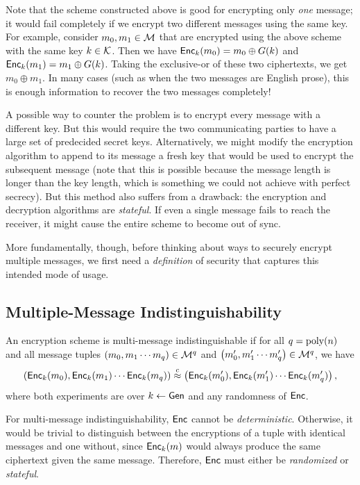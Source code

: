 \documentclass[11pt]{article}
\begin{document}
Note that the scheme constructed above is good for encrypting only
\emph{one} message; it would fail completely if we encrypt two
different messages using the same key.  For example, consider $m_0,
m_1 \in \mathcal{M}$ that are encrypted using the above scheme with the
same key $k \in \mathcal{K}$.  Then we have $\mathsf{Enc}_k(m_0) = m_0 \oplus
G(k)$ and $\mathsf{Enc}_k(m_1) = m_1 \oplus G(k)$.  Taking the exclusive-or
of these two ciphertexts, we get $m_0 \oplus m_1$.  In many cases
(such as when the two messages are English prose), this is enough
information to recover the two messages completely!

A possible way to counter the problem is to encrypt every message with
a different key.  But this would require the two communicating parties
to have a large set of predecided secret keys.  Alternatively, we
might modify the encryption algorithm to append to its message a fresh
key that would be used to encrypt the subsequent message (note that
this is possible because the message length is longer than the key
length, which is something we could not achieve with perfect secrecy).
But this method also suffers from a drawback: the encryption and
decryption algorithms are \emph{stateful}.  If even a single message
fails to reach the receiver, it might cause the entire scheme to
become out of sync.

More fundamentally, though, before thinking about ways to securely
encrypt multiple messages, we first need a \emph{definition} of
security that captures this intended mode of usage.

\subsection{Multiple-Message Indistinguishability}
\label{sec:mult-mess-indist}

\begin{definition}
  \label{def:multi-msg-indist}
  An encryption scheme is multi-message indistinguishable if for all
  $q=\operatorname{poly}(n)$ and all message tuples $\left( m_0, m_1 \cdots m_q
  \right) \in \mathcal{M}^q$ and $\left( m'_0, m'_1 \cdots m'_q \right)
  \in \mathcal{M}^q$, we have
  \[ \left( \mathsf{Enc}_k(m_0), \mathsf{Enc}_k(m_1) \cdots \mathsf{Enc}_k(m_q)
  \right) \stackrel{c}{\approx} \left( \mathsf{Enc}_k(m'_0), \mathsf{Enc}_k(m'_1) \cdots
    \mathsf{Enc}_k(m'_q) \right), \] where both experiments are over $k
  \gets \mathsf{Gen}$ and any randomness of $\mathsf{Enc}$.
\end{definition}

\begin{remark}
  For multi-message indistinguishability, $\mathsf{Enc}$ cannot be
  \emph{deterministic}.  Otherwise, it would be trivial to distinguish
  between the encryptions of a tuple with identical messages and one
  without, since $\mathsf{Enc}_{k}(m)$ would always produce the same
  ciphertext given the same message.  Therefore, $\mathsf{Enc}$ must either
  be \emph{randomized} or \emph{stateful}.
\end{remark}
\end{document}
